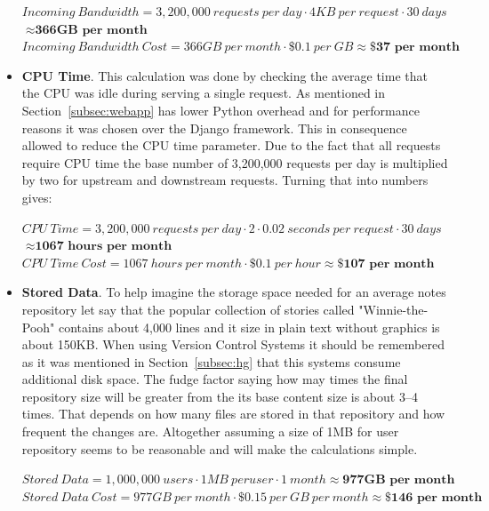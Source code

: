 \begin{itemize}
{$Incoming\ Bandwidth =  3,200,000\ requests\ per\ day \cdot 4KB\ per\ request \cdot 30\ days$\\ \hspace*{33mm} $\approx \textbf{366GB\ per\ month}$ \\ 
$Incoming\ Bandwidth\ Cost = 366GB\ per\ month \cdot \$0.1\ per\ GB \approx \textbf{\$37 per\ month}$ }

\item{\textbf{CPU Time}. This calculation was done by checking the average time that the CPU was idle during serving a single request. As mentioned in Section~\ref{subsec:webapp} has lower Python overhead and for performance reasons it was chosen over the Django framework. This in consequence allowed to reduce the CPU time parameter. Due to the fact that all requests require CPU time the base number of 3,200,000 requests per day is multiplied by two for upstream and downstream requests. Turning that into numbers gives:

$CPU\ Time =  3,200,000\ requests\ per\ day \cdot 2 \cdot 0.02\ seconds\ per\ request \cdot 30\ days$\\ \hspace*{17mm} $\approx \textbf{1067\ hours\ per\ month}$ \\ 
$CPU\ Time\ Cost = 1067\ hours\ per\ month \cdot \$0.1\ per\ hour \approx \textbf{\$107 per\ month}$}

\item{\textbf{Stored Data}. To help imagine the storage space needed for an average notes repository let say that the popular collection of stories called "Winnie-the-Pooh" contains about 4,000 lines and it size in plain text without graphics is about 150KB. When using Version Control Systems it should be remembered as it was mentioned in Section~\ref{subsec:hg} that this systems consume additional disk space. The fudge factor saying how may times the final repository  size will be greater from the its base content size is about 3--4 times. That depends on how many files are stored in that repository and how frequent the changes are. Altogether assuming a size of 1MB for user repository seems to be reasonable and will make the calculations simple.

$Stored\ Data =  1,000,000\ users\cdot 1MB\ per user \cdot 1\ month \approx \textbf{977GB\ per\ month}$ \\ 
$Stored\ Data\ Cost = 977GB\ per\ month \cdot \$0.15\ per\ GB\ per\ month \approx \textbf{\$146 per\ month}$}


\end{itemize}
